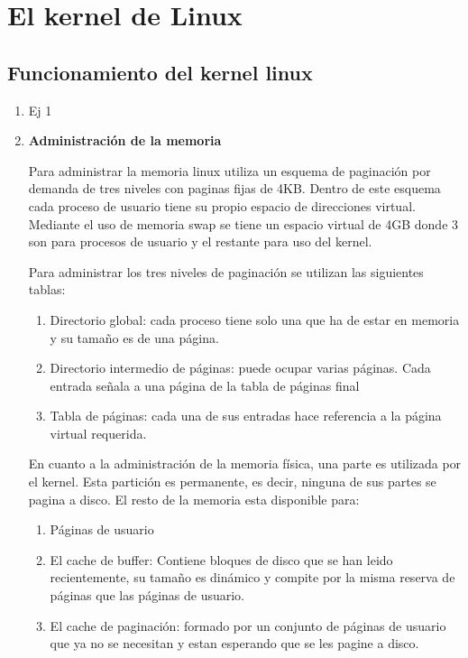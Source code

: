 \documentclass[a4paper,11pt] {article}
\begin{document}
\section*{El kernel de Linux}
\subsection*{Funcionamiento del kernel linux}
	\begin{enumerate}
		\item Ej 1

		\item \textbf{Administraci\'on de la memoria}

		Para administrar la memoria linux utiliza un esquema de paginaci\'on por demanda de tres niveles con paginas fijas de 4KB. Dentro de este esquema cada proceso de usuario tiene su propio espacio de direcciones virtual. Mediante el uso de memoria swap se tiene un espacio virtual de 4GB donde 3 son para procesos de usuario y el restante para uso del kernel.
		
		Para administrar los tres niveles de paginaci\'on se utilizan las siguientes tablas:
			\begin{enumerate}
			\item Directorio global: cada proceso tiene solo una que ha de estar en memoria y su tamaño es de una p\'agina.
			\item Directorio intermedio de p\'aginas: puede ocupar varias p\'aginas. Cada entrada señala a una p\'agina de la tabla de p\'aginas final
			\item Tabla de p\'aginas: cada una de sus entradas hace referencia a la p\'agina virtual requerida.
			\end{enumerate}
		En cuanto a la administraci\'on de la memoria f\'isica, una parte es utilizada por el kernel. Esta partici\'on es permanente, es decir, ninguna de sus partes se pagina a disco.
		El resto de la memoria esta disponible para:
			\begin{enumerate}
			\item P\'aginas de usuario
			\item El cache de buffer: Contiene bloques de disco que se han leido recientemente, su tamaño es din\'amico y compite por la misma reserva de p\'aginas que las p\'aginas de usuario.
			\item El cache de paginaci\'on: formado por un conjunto de p\'aginas de usuario que ya no se necesitan y estan esperando que se les pagine a disco.
			\end{enumerate}


\end{enumerate}
\end{document}
